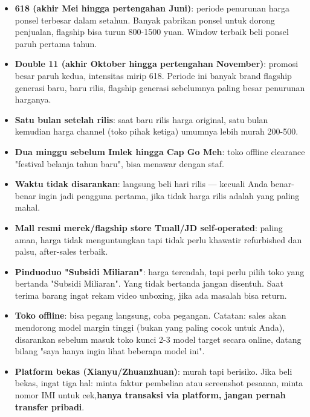 \begin{itemize}
  \item \textbf{618 (akhir Mei hingga pertengahan Juni)}: periode penurunan harga ponsel terbesar dalam setahun. Banyak pabrikan ponsel untuk dorong penjualan, flagship bisa turun 800-1500 yuan. Window terbaik beli ponsel paruh pertama tahun.
  \item \textbf{Double 11 (akhir Oktober hingga pertengahan November)}: promosi besar paruh kedua, intensitas mirip 618. Periode ini banyak brand flagship generasi baru, baru rilis, flagship generasi sebelumnya paling besar penurunan harganya.
  \item \textbf{Satu bulan setelah rilis}: saat baru rilis harga original, satu bulan kemudian harga channel (toko pihak ketiga) umumnya lebih murah 200-500.
  \item \textbf{Dua minggu sebelum Imlek hingga Cap Go Meh}: toko offline clearance "festival belanja tahun baru", bisa menawar dengan staf.
  \item \textbf{Waktu tidak disarankan}: langsung beli hari rilis — kecuali Anda benar-benar ingin jadi pengguna pertama, jika tidak harga rilis adalah yang paling mahal.
\end{itemize}


\begin{itemize}
  \item \textbf{Mall resmi merek/flagship store Tmall/JD self-operated}: paling aman, harga tidak menguntungkan tapi tidak perlu khawatir refurbished dan palsu, after-sales terbaik.
  \item \textbf{Pinduoduo "Subsidi Miliaran"}: harga terendah, tapi perlu pilih toko yang bertanda "Subsidi Miliaran". Yang tidak bertanda jangan disentuh. Saat terima barang ingat rekam video unboxing, jika ada masalah bisa return.
  \item \textbf{Toko offline}: bisa pegang langsung, coba pegangan. Catatan: sales akan mendorong model margin tinggi (bukan yang paling cocok untuk Anda), disarankan sebelum masuk toko kunci 2-3 model target secara online, datang bilang "saya hanya ingin lihat beberapa model ini".
  \item \textbf{Platform bekas (Xianyu/Zhuanzhuan)}: murah tapi berisiko. Jika beli bekas, ingat tiga hal: minta faktur pembelian atau screenshot pesanan, minta nomor IMI untuk cek,\textbf{hanya transaksi via platform, jangan pernah transfer pribadi}.
\end{itemize}

